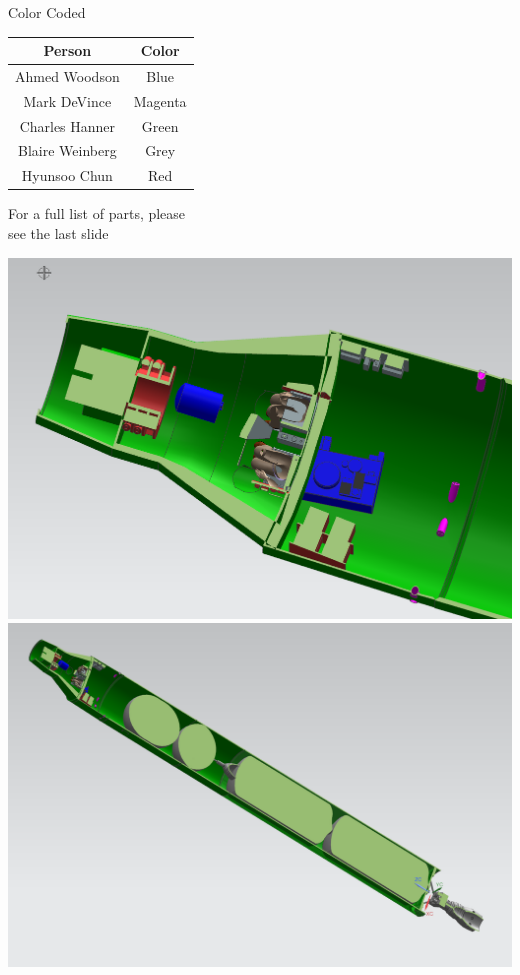 \documentclass[10pt]{beamer}
\begin{document}
	\begin{frame}{Color Coded}
		\begin{minipage}{0.45\textwidth}
			\begin{table}
				\begin{tabular}{|c|c|}\hline
					\textbf{Person} & \textbf{Color}\\ \hline
					Ahmed Woodson & Blue\\ \hline
					Mark DeVince & Magenta\\  \hline
					Charles Hanner & Green\\ \hline
					Blaire Weinberg & Grey\\  \hline
					Hyunsoo Chun & Red\\ \hline
				\end{tabular}
			\end{table}	
		
		For a full list of parts, please\\ see the last slide
		\end{minipage}%
		\begin{minipage}{0.54\textwidth}
			\includegraphics[width=\textwidth]{Color_Coded_Interior.png}			\includegraphics[width=\textwidth]{Color_Coded_Full.png}
		\end{minipage}
	\end{frame}
\end{document}
